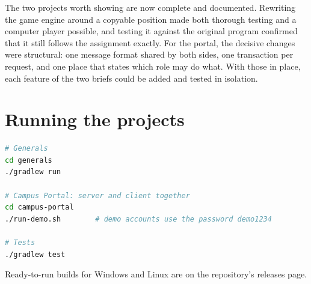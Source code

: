 \documentclass[11pt,a4paper]{article}
\begin{document}
The two projects worth showing are now complete and documented. Rewriting the game engine around a copyable position made both thorough testing and a computer player possible, and testing it against the original program confirmed that it still follows the assignment exactly. For the portal, the decisive changes were structural: one message format shared by both sides, one transaction per request, and one place that states which role may do what. With those in place, each feature of the two briefs could be added and tested in isolation.

\appendix
\section{Running the projects}

\begin{lstlisting}[language=bash]
# Generals
cd generals
./gradlew run

# Campus Portal: server and client together
cd campus-portal
./run-demo.sh        # demo accounts use the password demo1234

# Tests
./gradlew test
\end{lstlisting}

Ready-to-run builds for Windows and Linux are on the repository's releases page.
\end{document}
